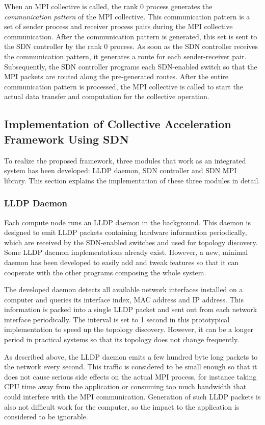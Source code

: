When an MPI collective is called, the rank 0 process generates the
\emph{communication pattern} of the MPI collective. This communication pattern is
a set of sender process and receiver process pairs during the MPI collective
communication. After the communication pattern is generated, this set is sent
to the SDN controller by the rank 0 process. As soon as the SDN controller
receives the communication pattern, it generates a route for each
sender-receiver pair. Subsequently, the SDN controller programs each
SDN-enabled switch so that the MPI packets are routed along the pre-generated
routes. After the entire communication pattern is processed, the MPI
collective is called to start the actual data transfer and computation for the
collective operation.

\subsection{Implementation of Collective Acceleration Framework Using SDN}

To realize the proposed framework, three modules that work as an integrated
system has been developed: LLDP daemon, SDN controller and SDN MPI library.
This section explains the implementation of these three modules in detail.

\subsubsection{LLDP Daemon}

Each compute node runs an LLDP daemon in the background. This daemon is
designed to emit LLDP packets containing hardware information periodically,
which are received by the SDN-enabled switches and used for topology
discovery. Some LLDP daemon implementations already exist. However, a new,
minimal daemon has been developed to easily add and tweak features so that it
can cooperate with the other programs composing the whole system.

The developed daemon detects all available network interfaces installed on a
computer and queries its interface index, MAC address and IP address.
This information is packed into a single LLDP packet and sent out from
each network interface periodically. The interval is set to 1 second in
this prototypical implementation to speed up the topology discovery.
However, it can be a longer period in practical systems so that its
topology does not change frequently.

As described above, the LLDP daemon emits a few hundred byte long packets to
the network every second. This traffic is considered to be small enough so
that it does not cause serious side effects on the actual MPI process, for
instance taking CPU time away from the application or consuming too much
bandwidth that could interfere with the MPI communication. Generation of such
LLDP packets is also not difficult work for the computer, so the
impact to the application is considered to be ignorable.

